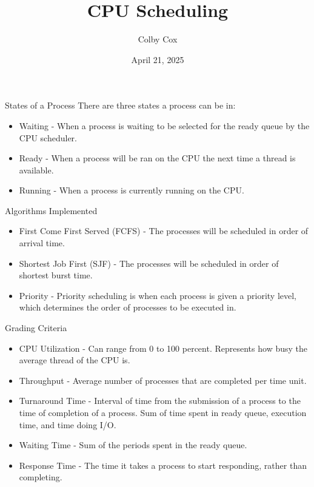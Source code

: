 \documentclass{beamer}
\title{CPU Scheduling}
\author{Colby Cox}
\institute {
  University of Central Arkansas
}
\date{April 21, 2025}
\begin{document}
\begin{frame}
	\titlepage
\end{frame}

\begin{frame}{States of a Process}
	There are three states a process can be in:
	\begin{itemize}
		\item Waiting - When a process is waiting to be selected for the ready queue by the CPU scheduler.
		\item Ready - When a process will be ran on the CPU the next time a thread is available.
		\item Running - When a process is currently running on the CPU.
	\end{itemize}
\end{frame}

\begin{frame}{Algorithms Implemented}
	\begin{itemize}
		\item First Come First Served (FCFS) - The processes will be scheduled in order of arrival time.
		\item Shortest Job First (SJF) - The processes will be scheduled in order of shortest burst time.
		\item Priority - Priority scheduling is when each process is given a priority level, which determines the order of processes to be executed in.\end{itemize}
\end{frame}

\begin{frame}{Grading Criteria}
	\begin{itemize}
		\item CPU Utilization - Can range from 0 to 100 percent. Represents how busy the average thread of the CPU is.
		\item Throughput - Average number of processes that are completed per time unit.
		\item Turnaround Time - Interval of time from the submission of a process to the time of completion of a process. Sum of time spent in ready queue, execution time, and time doing I/O.
		\item Waiting Time - Sum of the periods spent in the ready queue.
		\item Response Time - The time it takes a process to start responding, rather than completing.
	\end{itemize}
\end{frame}
\end{document}
